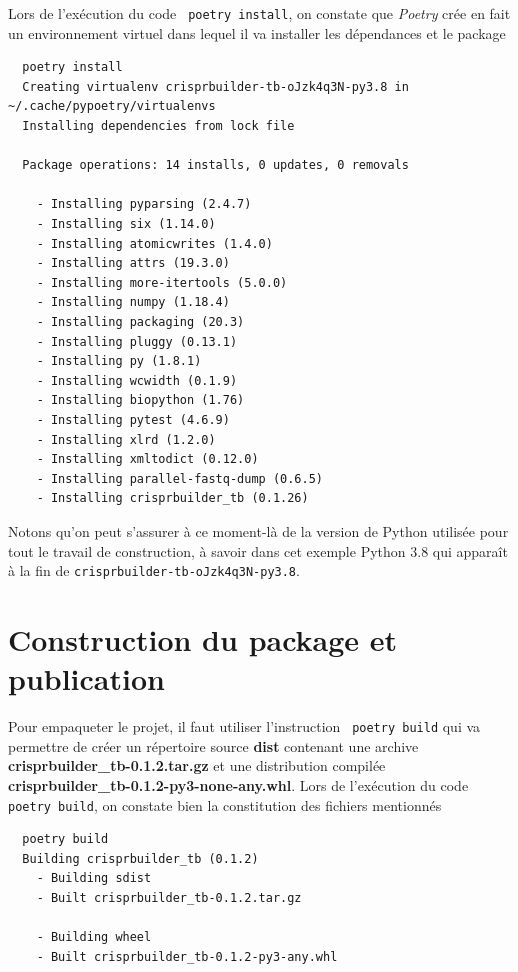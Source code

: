\documentclass[twoside,a4paper,11pt,frenchb,openany]{report}
\begin{document}
Lors de l'exécution du code \texttt{ poetry install}, on constate que \textit{Poetry} crée en fait un environnement virtuel dans lequel il va installer les dépendances et le package

\begin{verbatim}  poetry install
  Creating virtualenv crisprbuilder-tb-oJzk4q3N-py3.8 in ~/.cache/pypoetry/virtualenvs
  Installing dependencies from lock file

  Package operations: 14 installs, 0 updates, 0 removals

    - Installing pyparsing (2.4.7)
    - Installing six (1.14.0)
    - Installing atomicwrites (1.4.0)
    - Installing attrs (19.3.0)
    - Installing more-itertools (5.0.0)
    - Installing numpy (1.18.4)
    - Installing packaging (20.3)
    - Installing pluggy (0.13.1)
    - Installing py (1.8.1)
    - Installing wcwidth (0.1.9)
    - Installing biopython (1.76)
    - Installing pytest (4.6.9)
    - Installing xlrd (1.2.0)
    - Installing xmltodict (0.12.0)
    - Installing parallel-fastq-dump (0.6.5)
    - Installing crisprbuilder_tb (0.1.26)\end{verbatim}

Notons qu'on peut s'assurer à ce moment-là de la version de Python utilisée pour tout le travail de construction, à savoir dans cet exemple Python 3.8 qui apparaît à la fin de \texttt{crisprbuilder-tb-oJzk4q3N-py3.8}.




\section{Construction du package et publication}

Pour empaqueter le projet, il faut utiliser l’instruction
\texttt{ poetry build}
qui va permettre de créer un répertoire source \textbf{dist} contenant une archive \textbf{crisprbuilder\_tb-0.1.2.tar.gz} et une distribution compilée \textbf{crisprbuilder\_tb-0.1.2-py3-none-any.whl}. Lors de l'exécution du code \texttt{ poetry build}, on constate bien la constitution des fichiers mentionnés

\begin{verbatim}  poetry build
  Building crisprbuilder_tb (0.1.2)
    - Building sdist
    - Built crisprbuilder_tb-0.1.2.tar.gz

    - Building wheel
    - Built crisprbuilder_tb-0.1.2-py3-any.whl\end{verbatim}
\end{document}
